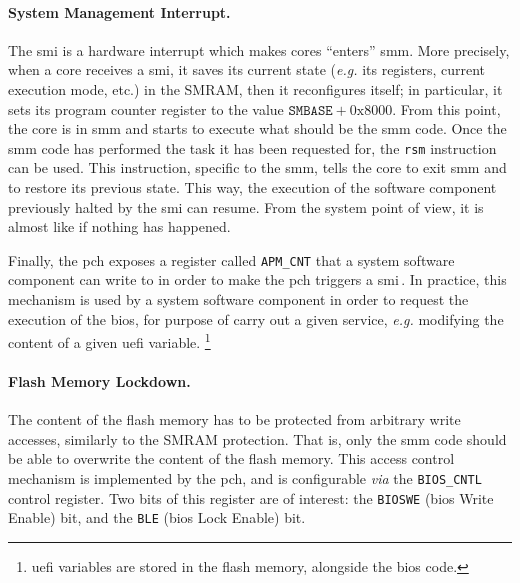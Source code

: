 \paragraph{System Management Interrupt.}

The \ac{smi} is a hardware interrupt which makes cores ``enters'' \ac{smm}.
%
More precisely, when a core receives a \ac{smi}, it saves its current state
(\emph{e.g.} its registers, current execution mode, etc.) in the SMRAM, then it
reconfigures itself;
%
in particular, it sets its program counter register to the value
$\mathtt{SMBASE} + \mathrm{0x8000}$.
%
From this point, the core is in \ac{smm} and starts to execute what should be
the \ac{smm} code.
%
Once the \ac{smm} code has performed the task it has been requested for, the
\texttt{rsm} instruction can be used.
%
This instruction, specific to the \ac{smm}, tells the core to exit \ac{smm} and
to restore its previous state.
%
This way, the execution of the software component previously halted by the
\ac{smi} can resume.
%
From the system point of view, it is almost like if nothing has happened.

Finally, the \ac{pch} exposes a register called \texttt{APM\_CNT} that a system
software component can write to in order to make the \ac{pch} triggers a
\ac{smi}\,\cite{intel2012pch}.
%
In practice, this mechanism is used by a system software component in order to
request the execution of the \ac{bios}, for purpose of carry out a given
service, \emph{e.g.} modifying the content of a given \ac{uefi} variable.
%
\footnote{\ac{uefi} variables are stored in the flash memory, alongside the
  \ac{bios} code.}

\paragraph{Flash Memory Lockdown.}
%
The content of the flash memory has to be protected from arbitrary write
accesses, similarly to the SMRAM protection.
%
That is, only the \ac{smm} code should be able to overwrite the content of the
flash memory.
%
This access control mechanism is implemented by the \ac{pch}, and is
configurable \emph{via} the \texttt{BIOS\_CNTL} control register.
%
Two bits of this register are of interest: the \texttt{BIOSWE} (\ac{bios} Write
Enable) bit, and the \texttt{BLE} (\ac{bios} Lock Enable) bit.

